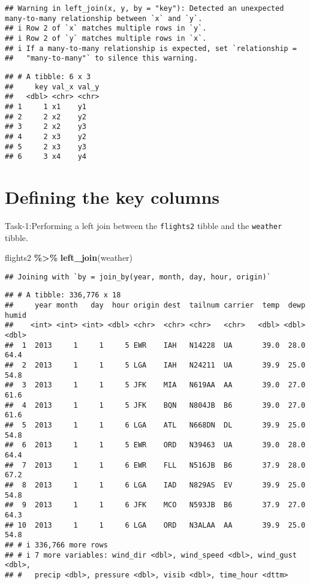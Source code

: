 \documentclass[
]{article}
\newenvironment{Shaded}{\begin{snugshade}}{\end{snugshade}}
\newcommand{\FunctionTok}[1]{\textcolor[rgb]{0.13,0.29,0.53}{\textbf{#1}}}
\newcommand{\NormalTok}[1]{#1}
\newcommand{\SpecialCharTok}[1]{\textcolor[rgb]{0.81,0.36,0.00}{\textbf{#1}}}
\begin{document}
\begin{verbatim}
## Warning in left_join(x, y, by = "key"): Detected an unexpected many-to-many relationship between `x` and `y`.
## i Row 2 of `x` matches multiple rows in `y`.
## i Row 2 of `y` matches multiple rows in `x`.
## i If a many-to-many relationship is expected, set `relationship =
##   "many-to-many"` to silence this warning.
\end{verbatim}

\begin{verbatim}
## # A tibble: 6 x 3
##     key val_x val_y
##   <dbl> <chr> <chr>
## 1     1 x1    y1   
## 2     2 x2    y2   
## 3     2 x2    y3   
## 4     2 x3    y2   
## 5     2 x3    y3   
## 6     3 x4    y4
\end{verbatim}

\hypertarget{defining-the-key-columns}{%
\section{Defining the key columns}\label{defining-the-key-columns}}

Task-1:Performing a left join between the \texttt{flights2} tibble and
the \texttt{weather} tibble.

\begin{Shaded}
\begin{Highlighting}[]
\NormalTok{flights2 }\SpecialCharTok{\%\textgreater{}\%} 
  \FunctionTok{left\_join}\NormalTok{(weather)}
\end{Highlighting}
\end{Shaded}

\begin{verbatim}
## Joining with `by = join_by(year, month, day, hour, origin)`
\end{verbatim}

\begin{verbatim}
## # A tibble: 336,776 x 18
##     year month   day  hour origin dest  tailnum carrier  temp  dewp humid
##    <int> <int> <int> <dbl> <chr>  <chr> <chr>   <chr>   <dbl> <dbl> <dbl>
##  1  2013     1     1     5 EWR    IAH   N14228  UA       39.0  28.0  64.4
##  2  2013     1     1     5 LGA    IAH   N24211  UA       39.9  25.0  54.8
##  3  2013     1     1     5 JFK    MIA   N619AA  AA       39.0  27.0  61.6
##  4  2013     1     1     5 JFK    BQN   N804JB  B6       39.0  27.0  61.6
##  5  2013     1     1     6 LGA    ATL   N668DN  DL       39.9  25.0  54.8
##  6  2013     1     1     5 EWR    ORD   N39463  UA       39.0  28.0  64.4
##  7  2013     1     1     6 EWR    FLL   N516JB  B6       37.9  28.0  67.2
##  8  2013     1     1     6 LGA    IAD   N829AS  EV       39.9  25.0  54.8
##  9  2013     1     1     6 JFK    MCO   N593JB  B6       37.9  27.0  64.3
## 10  2013     1     1     6 LGA    ORD   N3ALAA  AA       39.9  25.0  54.8
## # i 336,766 more rows
## # i 7 more variables: wind_dir <dbl>, wind_speed <dbl>, wind_gust <dbl>,
## #   precip <dbl>, pressure <dbl>, visib <dbl>, time_hour <dttm>
\end{verbatim}
\end{document}
